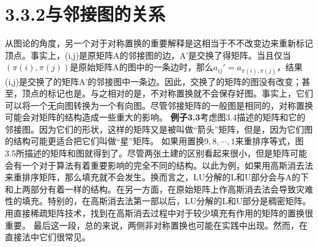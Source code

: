 \documentclass{article}
\begin{document}
\section*{3.3.2与邻接图的关系}
从图论的角度，另一个对于对称置换的重要解释是这相当于不不改变边来重新标记顶点。事实上，(i,j)是原矩阵A的邻接图的边，A'是交换了得矩阵。当且仅当$(\pi(i),\pi(j))$是原始矩阵A的图中的一条边时，那么$a_{ij}'=a_{\pi(i),\pi(j)}$，结果(i,j)是交换了的矩阵A'的邻接图中一条边。因此，交换了的矩阵的图没有改变；甚至，顶点的标记也是。与之相对的是，不对称置换就不会保存好图。事实上，它们可以将一个无向图转换为一个有向图。尽管邻接矩阵的一般图是相同的，对称置换可能会对矩阵的结构造成一些重大的影响。
\newline
\textbf{例子3.3}考虑图3.4描述的矩阵和它的邻接图。因为它们的形状，这样的矩阵又是被叫做“箭头”矩阵，但是，因为它们图的结构可能更适合把它们叫做“星”矩阵。
\newline
如果用置换$9,8,\cdots,1$来重排序等式，图3.5所描述的矩阵和图就得到了。尽管两张土建的区别看起来很小，但是矩阵可能会有一个对于算法有着重要影响的完全不同的结构。以此为例，如果用高斯消去法来重排序矩阵，那么填充就不会发生。换而言之，LU分解的L和U部分会与A的下和上两部分有着一样的结构。在另一方面，在原始矩阵上作高斯消去法会导致灾难性的填充。特别的，在高斯消去法第一部以后，LU分解的L和U部分是稠密矩阵。用直接稀疏矩阵技术，找到在高斯消去过程中对于较少填充有作用的矩阵的置换很重要。
\newline
最后这一段，总的来说，两侧非对称置换也可能在实践中出现。然而，在直接法中它们很常见。
\end{document}

